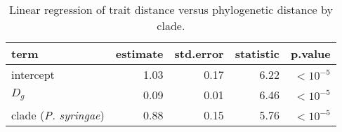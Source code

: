 \newpage
\begin{table}[!ht]

\caption{\label{tab:}Linear regression of trait distance versus phylogenetic distance by clade.}
\centering
\begin{tabular}[t]{lrrrr}
\toprule
term & estimate & std.error & statistic & p.value\\
\midrule
intercept & 1.03 & 0.17 & 6.22 & $<10^{-5}$\\
$D_{g}$ & 0.09 & 0.01 & 6.46 & $<10^{-5}$\\
clade (\textit{P. syringae}) & 0.88 & 0.15 & 5.76 & $<10^{-5}$\\
\bottomrule
\end{tabular}
\end{table}
\newpage
